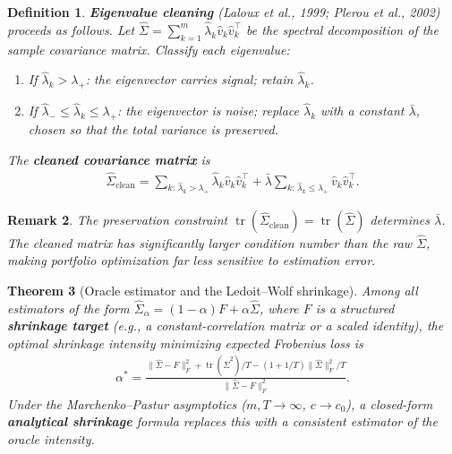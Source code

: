 \documentclass{report}
\theoremstyle{spacedplain}
\newtheorem{theorem}{Theorem}[section]
\theoremstyle{spaceddefinition}
\newtheorem{definition}[theorem]{Definition}
\theoremstyle{spacedremark}
\newtheorem{remark}[theorem]{Remark}
\begin{document}
\begin{definition}
\textbf{Eigenvalue cleaning} (Laloux et al., 1999; Plerou et al., 2002) proceeds as follows. Let $\hat{\Sigma} = \sum_{k=1}^m \hat{\lambda}_k \hat{v}_k \hat{v}_k^\top$ be the spectral decomposition of the sample covariance matrix. Classify each eigenvalue:
\begin{enumerate}
    \item If $\hat{\lambda}_k > \lambda_+$: the eigenvector carries signal; retain
          $\hat{\lambda}_k$.
    \item If $\hat{\lambda}_- \leq \hat{\lambda}_k \leq \lambda_+$: the
          eigenvector is noise; replace $\hat{\lambda}_k$ with a constant
          $\bar{\lambda}$, chosen so that the total variance is preserved.
\end{enumerate}
The \textbf{cleaned covariance matrix} is
\begin{align}
    \hat{\Sigma}_{\mathrm{clean}} = \sum_{k:\,\hat{\lambda}_k > \lambda_+}
    \hat{\lambda}_k \hat{v}_k \hat{v}_k^\top
    + \bar{\lambda}\sum_{k:\,\hat{\lambda}_k \leq \lambda_+}
    \hat{v}_k \hat{v}_k^\top.
\end{align}
\end{definition}
 
\begin{remark}
The preservation constraint $\operatorname{tr}(\hat{\Sigma}_{\mathrm{clean}}) =
\operatorname{tr}(\hat{\Sigma})$ determines $\bar{\lambda}$. The cleaned matrix has significantly larger condition number than the raw $\hat{\Sigma}$, making portfolio optimization far less sensitive to estimation error.
\end{remark}
 
\begin{theorem}[Oracle estimator and the Ledoit--Wolf shrinkage]
Among all estimators of the form $\hat{\Sigma}_\alpha = (1-\alpha)F + \alpha\hat{\Sigma}$, where $F$ is a structured \textbf{shrinkage target} (e.g., a constant-correlation
matrix or a scaled identity), the optimal shrinkage intensity minimizing expected Frobenius loss is
\begin{align}
    \alpha^* = \frac{\|\hat{\Sigma} - F\|_F^2 + \operatorname{tr}(\hat{\Sigma}^2)/T
    - (1 + 1/T)\|\hat{\Sigma}\|_F^2/T}
    {\|\hat{\Sigma} - F\|_F^2}.
\end{align}
Under the Marchenko--Pastur asymptotics ($m,T\to\infty$, $c\to c_0$), a closed-form \textbf{analytical shrinkage} formula replaces this with a consistent estimator of the oracle intensity.
\end{theorem}
 
\end{document}
